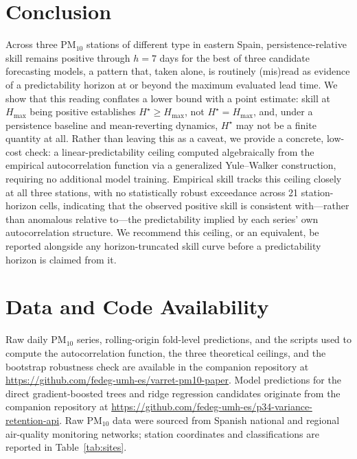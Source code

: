 \documentclass{article}
\newcommand{\hstar}{H^{\star}}
\begin{document}
\section{Conclusion}

Across three PM$_{10}$ stations of different type in eastern Spain,
persistence-relative skill remains positive through $h=7$ days for the best
of three candidate forecasting models, a pattern that, taken alone, is
routinely (mis)read as evidence of a predictability horizon at or beyond the
maximum evaluated lead time.
We show that this reading conflates a lower bound with a point estimate: skill
at $H_{\max}$ being positive establishes $\hstar\ge H_{\max}$, not
$\hstar=H_{\max}$, and, under a persistence baseline and mean-reverting
dynamics, $\hstar$ may not be a finite quantity at all.
Rather than leaving this as a caveat, we provide a concrete, low-cost check:
a linear-predictability ceiling computed algebraically from the empirical
autocorrelation function via a generalized Yule--Walker construction, requiring
no additional model training.
Empirical skill tracks this ceiling closely at all three stations, with no
statistically robust exceedance across 21 station-horizon cells, indicating
that the observed positive skill is consistent with---rather than anomalous
relative to---the predictability implied by each series' own autocorrelation
structure.
We recommend this ceiling, or an equivalent, be reported alongside any
horizon-truncated skill curve before a predictability horizon is claimed from
it.

\section*{Data and Code Availability}

Raw daily PM$_{10}$ series, rolling-origin fold-level predictions, and the
scripts used to compute the autocorrelation function, the three theoretical
ceilings, and the bootstrap robustness check are available in the companion
repository at
\url{https://github.com/fedeg-umh-es/varret-pm10-paper}.
Model predictions for the direct gradient-boosted trees and ridge regression
candidates originate from the companion repository at
\url{https://github.com/fedeg-umh-es/p34-variance-retention-api}.
Raw PM$_{10}$ data were sourced from Spanish national and regional air-quality
monitoring networks; station coordinates and classifications are reported in
Table~\ref{tab:sites}.



\end{document}
